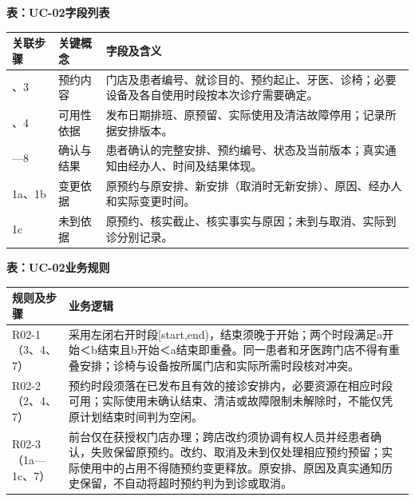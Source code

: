 \documentclass[UTF8,a4paper,zihao=-4,fontset=none]{ctexart}
\begin{document}
{\small\setlength{\tabcolsep}{3pt}\renewcommand{\arraystretch}{1.10}
\noindent\textbf{表\thetable：UC-02字段列表}\par\smallskip
\noindent\begin{tabular}{@{}>{\raggedright\arraybackslash}p{2cm}>{\raggedright\arraybackslash}p{3cm}>{\raggedright\arraybackslash}p{10.7cm}@{}}
\toprule
关联步骤 & 关键概念 & 字段及含义 \\ \midrule
1、3 & 预约内容 & 门店及患者编号、就诊目的、预约起止、牙医、诊椅；必要设备及各自使用时段按本次诊疗需要确定。 \\
2、4 & 可用性依据 & 发布日期排班、原预留、实际使用及清洁故障停用；记录所据安排版本。 \\
5—8 & 确认与结果 & 患者确认的完整安排、预约编号、状态及当前版本；真实通知由经办人、时间及结果体现。 \\
1a、1b & 变更依据 & 原预约与原安排、新安排（取消时无新安排）、原因、经办人和实际变更时间。 \\
1c & 未到依据 & 原预约、核实截止、核实事实与原因；未到与取消、实际到诊分别记录。 \\
\bottomrule
\end{tabular}\par}
\medskip
{\small\setlength{\tabcolsep}{3pt}\renewcommand{\arraystretch}{1.10}
\noindent\textbf{表\thetable：UC-02业务规则}\par\smallskip
\noindent\begin{tabular}{@{}>{\raggedright\arraybackslash}p{3.4cm}>{\raggedright\arraybackslash}p{12.3cm}@{}}
\toprule
规则及步骤 & 业务逻辑 \\ \midrule
R02-1（3、4、7） & 采用左闭右开时段[start,end)，结束须晚于开始；两个时段满足a开始＜b结束且b开始＜a结束即重叠。同一患者和牙医跨门店不得有重叠安排；诊椅与设备按所属门店和实际所需时段核对冲突。 \\
R02-2（2、4、7） & 预约时段须落在已发布且有效的接诊安排内，必要资源在相应时段可用；实际使用未确认结束、清洁或故障限制未解除时，不能仅凭原计划结束时间判为空闲。 \\
R02-3（1a—1c、7） & 前台仅在获授权门店办理；跨店改约须协调有权人员并经患者确认，失败保留原预约。改约、取消及未到仅处理相应预约预留；实际使用中的占用不得随预约变更释放。原安排、原因及真实通知历史保留，不自动将超时预约判为到诊或取消。 \\
\bottomrule
\end{tabular}\par}
\medskip
\endgroup
\clearpage
\end{document}
